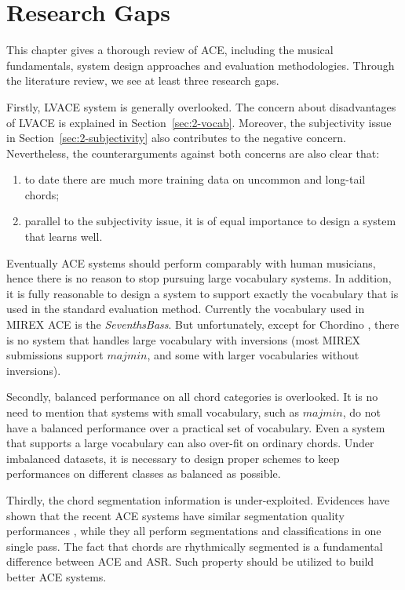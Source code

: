 \section{Research Gaps} \label{sec:2-summary}
This chapter gives a thorough review of ACE, including the musical fundamentals, system design approaches and evaluation methodologies. Through the literature review, we see at least three research gaps.

Firstly, LVACE system is generally overlooked. The concern about disadvantages of LVACE is explained in Section~\ref{sec:2-vocab}. Moreover, the subjectivity issue in Section~\ref{sec:2-subjectivity} also contributes to the negative concern. Nevertheless, the counterarguments against both concerns are also clear that:
\begin{enumerate}
\item to date there are much more training data on uncommon and long-tail chords;
\item parallel to the subjectivity issue, it is of equal importance to design a system that learns well.
\end{enumerate}
Eventually ACE systems should perform comparably with human musicians, hence there is no reason to stop pursuing large vocabulary systems. In addition, it is fully reasonable to design a system to support exactly the vocabulary that is used in the standard evaluation method. Currently the vocabulary used in MIREX ACE is the \textit{SeventhsBass}. But unfortunately, except for Chordino \cite{cannam2010sonic}, there is no system that handles large vocabulary with inversions (most MIREX submissions support $majmin$, and some with larger vocabularies without inversions). %

Secondly, balanced performance on all chord categories is overlooked. It is no need to mention that systems with small vocabulary, such as $majmin$, do not have a balanced performance over a practical set of vocabulary. Even a system that supports a large vocabulary can also over-fit on ordinary chords. Under imbalanced datasets, it is necessary to design proper schemes to keep performances on different classes as balanced as possible.

Thirdly, the chord segmentation information is under-exploited. Evidences have shown that the recent ACE systems have similar segmentation quality performances \cite{burgoyne2014comparative}, while they all perform segmentations and classifications in one single pass. The fact that chords are rhythmically segmented is a fundamental difference between ACE and ASR. Such property should be utilized to build better ACE systems.

